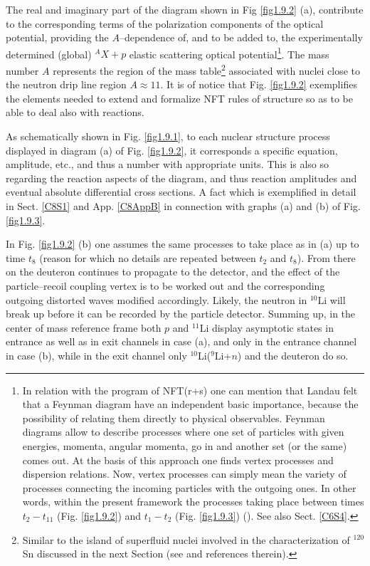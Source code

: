 The real and imaginary part of the diagram shown in Fig \ref{fig1.9.2} (a), contribute to the corresponding terms of the polarization components of the optical potential, providing the $A$--dependence of, and to be added to, the experimentally determined (global) $^AX+p$ elastic scattering optical potential\footnote{In relation with the program of NFT(r+s) one can mention that Landau felt that a Feynman diagram have an independent basic importance, because the possibility of relating them directly to physical observables. Feynman diagrams allow to describe processes where one set of particles with given energies, momenta, angular momenta, go in and another set (or the same) comes out. At the basis of this approach one finds vertex processes and dispersion relations. Now, vertex processes can simply mean the variety of processes connecting the incoming particles with the outgoing ones. In other words, within the present framework the processes taking place between times $t_2-t_{11}$ (Fig. \ref{fig1.9.2}) and $t_1-t_2$ (Fig. \ref{fig1.9.3}) (\cite{Landau:59,terHaar:69}). See also Sect. \ref{C6S4}.}. The mass number $A$ represents the region of the mass table\footnote{Similar to the island of superfluid nuclei involved in the characterization of $^{120}$Sn discussed in the next Section (see \cite{Idini:15} and references therein).} associated with nuclei close to the neutron  drip line region $A\approx11$.
  It is of
notice that Fig. \ref{fig1.9.2} exemplifies  the elements needed to extend and formalize NFT rules of
structure so as to be able to deal also with reactions.

As schematically shown in Fig. \ref{fig1.9.1}, to each nuclear structure process displayed in diagram (a) of Fig. \ref{fig1.9.2}, it corresponds a specific equation, amplitude, etc., and thus a number with appropriate units. This is also so regarding the reaction aspects of the diagram, and thus reaction amplitudes and eventual absolute differential cross sections. A fact which is exemplified in detail in Sect. \ref{C8S1} and App. \ref{C8AppB} in connection with graphs (a) and (b) of Fig. \ref{fig1.9.3}.


 In Fig. \ref{fig1.9.2} (b) one assumes the same processes to take place  as in (a) up to time $t_8$ (reason for which no details
are repeated between $t_2$ and $t_8$). From there on the deuteron continues to propagate to
the detector, and the effect of the particle--recoil coupling vertex is to be worked out and the corresponding outgoing distorted waves modified accordingly. Likely, the neutron in $^{10}$Li will break up
before it can be recorded by the particle detector. Summing up, in the center of mass reference frame both $p$ and $^{11}$Li
display asymptotic states in entrance as well as in exit channels in case (a), and only
in the entrance channel in case (b), while in the exit channel only $^{10}$Li($^9$Li+$n$) and the
deuteron do so. 

